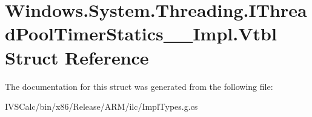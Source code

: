 \hypertarget{struct_windows_1_1_system_1_1_threading_1_1_i_thread_pool_timer_statics_____impl_1_1_vtbl}{}\section{Windows.\+System.\+Threading.\+I\+Thread\+Pool\+Timer\+Statics\+\_\+\+\_\+\+Impl.\+Vtbl Struct Reference}
\label{struct_windows_1_1_system_1_1_threading_1_1_i_thread_pool_timer_statics_____impl_1_1_vtbl}


The documentation for this struct was generated from the following file\+:\begin{DoxyCompactItemize}
\item 
I\+V\+S\+Calc/bin/x86/\+Release/\+A\+R\+M/ilc/Impl\+Types.\+g.\+cs\end{DoxyCompactItemize}
